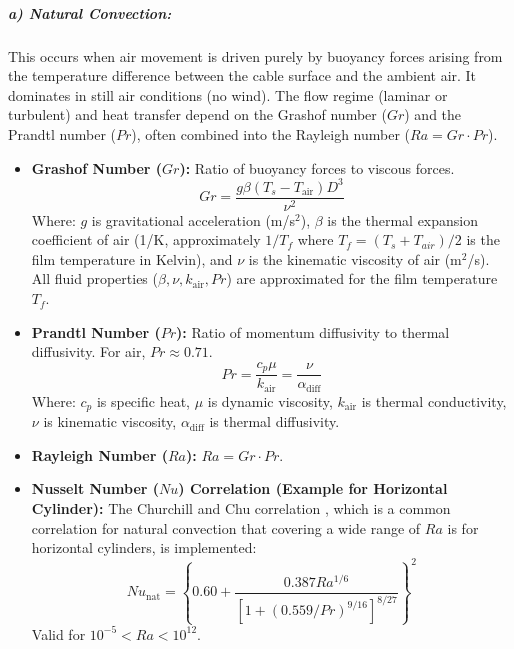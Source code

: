 \documentclass[12pt, a4paper]{article}
\begin{document}
\subparagraph{a) Natural Convection:}
This occurs when air movement is driven purely by buoyancy forces arising from the temperature difference between the cable surface and the ambient air. It dominates in still air conditions (no wind). The flow regime (laminar or turbulent) and heat transfer depend on the Grashof number ($Gr$) and the Prandtl number ($Pr$), often combined into the Rayleigh number ($Ra = Gr \cdot Pr$).
\begin{itemize}
    \item \textbf{Grashof Number ($Gr$):} Ratio of buoyancy forces to viscous forces.
        \begin{equation}
        Gr = \frac{g \beta (T_s - T_{\text{air}}) D^3}{\nu^2}
        \end{equation}
        Where: $g$ is gravitational acceleration (m/s$^2$), $\beta$ is the thermal expansion coefficient of air (1/K, approximately $1/T_f$ where $T_f = (T_s+T_{air})/2$ is the film temperature in Kelvin), and $\nu$ is the kinematic viscosity of air (m$^2$/s). All fluid properties ($\beta, \nu, k_{\text{air}}, Pr$) are approximated for the film temperature $T_f$.
    \item \textbf{Prandtl Number ($Pr$):} Ratio of momentum diffusivity to thermal diffusivity. For air, $Pr \approx 0.71$.
        \begin{equation}
        Pr = \frac{c_p \mu}{k_{\text{air}}} = \frac{\nu}{\alpha_{\text{diff}}}
        \end{equation}
        Where: $c_p$ is specific heat, $\mu$ is dynamic viscosity, $k_{\text{air}}$ is thermal conductivity, $\nu$ is kinematic viscosity, $\alpha_{\text{diff}}$ is thermal diffusivity.
    \item \textbf{Rayleigh Number ($Ra$):} $Ra = Gr \cdot Pr$.
    \item \textbf{Nusselt Number ($Nu$) Correlation (Example for Horizontal Cylinder):} The Churchill and Chu correlation , which is a common correlation for  natural convection that covering a wide range of $Ra$ is for horizontal cylinders, is implemented:
        \begin{equation}
        Nu_{\text{nat}} = \left\{ 0.60 + \frac{0.387 Ra^{1/6}}{\left[1 + (0.559/Pr)^{9/16}\right]^{8/27}} \right\}^2
        \end{equation}
        Valid for $10^{-5} < Ra < 10^{12}$.
\end{itemize}
\end{document}
